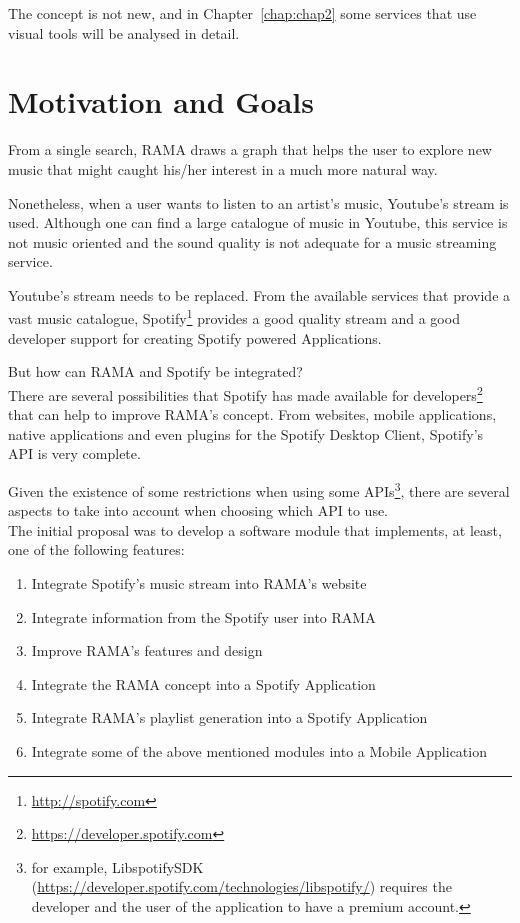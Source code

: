   The concept is not new, and in Chapter~\ref{chap:chap2} some services that use visual tools will be analysed in detail.


\section{Motivation and Goals} \label{sec:goals}

  From a single search, RAMA draws a graph that helps the user to explore new music that might caught his/her interest in a much more natural way.

  Nonetheless, when a user wants to listen to an artist's music, Youtube's stream is used.
  Although one can find a large catalogue of music in Youtube, this service is not music oriented and the sound quality is not adequate for a music streaming service.

  Youtube's stream needs to be replaced.
  From the available services that provide a vast music catalogue, Spotify\footnote{\url{http://spotify.com}} provides a good quality stream and a good developer support for creating Spotify powered Applications.

  But how can RAMA and Spotify be integrated? \\

  There are several possibilities that Spotify has made available for developers\footnote{\url{https://developer.spotify.com}} that can help to improve RAMA's concept.
  From websites, mobile applications, native applications and even plugins for the Spotify Desktop Client, Spotify's API is very complete.

  Given the existence of some restrictions when using some APIs\footnote{for example, LibspotifySDK (\url{https://developer.spotify.com/technologies/libspotify/}) requires the developer and the user of the application to have a premium account.}, there are several aspects to take into account when choosing which API to use. \\

  The initial proposal was to develop a software module that implements, at least, one of the following features:

  \begin{enumerate}
    \item \label{intro:obj1} Integrate Spotify's music stream into RAMA's website
    \item \label{intro:obj2} Integrate information from the Spotify user into RAMA
    \item \label{intro:obj3} Improve RAMA's features and design
    \item \label{intro:obj4} Integrate the RAMA concept into a Spotify Application
    \item \label{intro:obj5} Integrate RAMA's playlist generation into a Spotify Application
    \item \label{intro:obj6} Integrate some of the above mentioned modules into a Mobile Application
  \end{enumerate}

